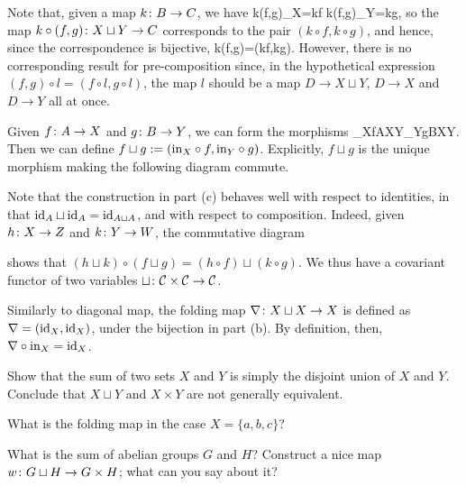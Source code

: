 Note that, given a map $k\colon B\to C$, we have
\bse
k\circ(f,g)\circ \inj_X=k\circ f \qquad {} \qquad k\circ(f,g)\circ \inj_Y=k\circ g,
\ese
so the map $k\circ (f,g)\colon  X\sqcup Y\to C$ corresponds to the pair $(k\circ f,k\circ g)$, and hence, since the correspondence is bijective,
\bse
k\circ(f,g)=(k\circ f,k\circ g).
\ese
However, there is no corresponding result for pre-composition since, in the hypothetical expression $(f,g)\circ l=(f\circ l,g\circ l)$, the map $l$ should be a map $D\to X\sqcup Y$, $D\to X$ and $D\to Y$ all at once.
\item Given $f\colon A\to X$ and $g\colon B\to Y$, we can form the morphisms
\bse
\inj_X\circ f\cl A\to X\sqcup Y\qquad {}\qquad \inj_Y\circ g\cl B\to X\sqcup Y.
\ese
Then we can define $f\sqcup g:=(\mathrm{in}_X\circ f,\mathrm{in}_Y\circ g)$. Explicitly, $f\sqcup g$ is the unique morphism making the following diagram commute.
\bse
{}
\ese
\item Note that the construction in part (c) behaves well with respect to identities, in that $\mathrm{id}_A\sqcup\mathrm{id}_A=\mathrm{id}_{A\sqcup A}$, and with respect to composition. Indeed, given $h\colon X\to Z$ and $k\colon Y\to W$, the commutative diagram
\bse
{}
\ese
shows that $(h\sqcup k)\circ(f\sqcup g)=(h\circ f)\sqcup(k\circ g)$. We thus have a covariant functor of two variables $\sqcup\colon \mathcal{C}\times \mathcal{C}\to \mathcal{C}$. 
\item Similarly to diagonal map, the folding map $\nabla\colon X\sqcup X\to X$ is defined as $\nabla=(\mathrm{id}_X,\mathrm{id}_X)$, under the bijection in part (b). By definition, then, $\nabla\circ\mathrm{in}_X=\mathrm{id}_X$.
\een
\es


\bx
\ben[label=(\alph*)]
\item Show that the sum of two sets $X$ and $Y$ is simply the disjoint union of $X$ and $Y$. Conclude that $X\sqcup Y$ and $X\times Y$ are not generally equivalent.
\item What is the folding map in the case $X = \{a, b, c\}$?
\item What is the sum of abelian groups $G$ and $H$? Construct a nice map $w \colon G \sqcup H \to G \times H$; what can you say about it?
\een
\ex

